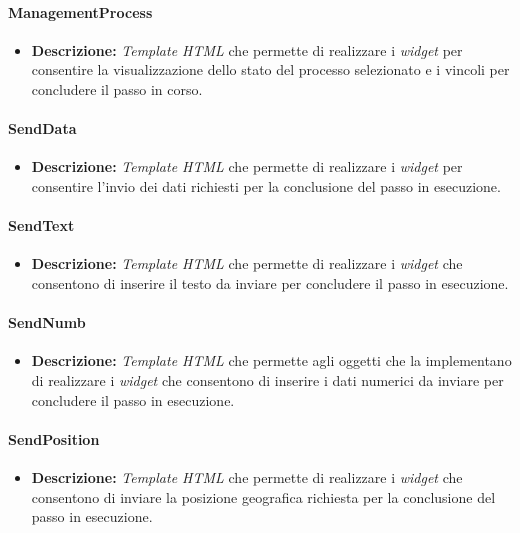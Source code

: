 \paragraph{ManagementProcess}
\label{managementProcessTemplate}
\begin{itemize}
\item \textbf{Descrizione:} \textit{Template HTML} che permette di realizzare i \textit{widget} per consentire la visualizzazione dello stato del processo selezionato e i vincoli per concludere il passo in corso.
\end{itemize}

\paragraph{SendData}
\label{sendDataTemplate}
\begin{itemize}
\item \textbf{Descrizione:} \textit{Template HTML} che permette di realizzare i \textit{widget} per consentire l'invio dei dati richiesti per la conclusione del passo in esecuzione.
\end{itemize}

\paragraph{SendText}
\label{sendTextTemplate}
\begin{itemize}
\item \textbf{Descrizione:} \textit{Template HTML} che permette di realizzare i \textit{widget} che consentono di inserire il testo da inviare per concludere il passo in esecuzione.
\end{itemize}

\paragraph{SendNumb}
\label{sendNumbTemplate}
\begin{itemize}
\item \textbf{Descrizione:} \textit{Template HTML} che permette agli oggetti che la implementano di realizzare i \textit{widget} che consentono di inserire i dati numerici da inviare per concludere il passo in esecuzione.
\end{itemize}

\paragraph{SendPosition}
\label{sendPositionTemplate}
\begin{itemize}
\item \textbf{Descrizione:} \textit{Template HTML} che permette  di realizzare i \textit{widget} che consentono di inviare la posizione geografica richiesta per la conclusione del passo in esecuzione.
\end{itemize}

